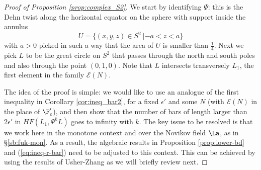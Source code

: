\begin{proof}[Proof of Proposition \ref{prop:complex_S2}]
We start by identifying $\Psi$: this is the Dehn twist along the 
horizontal equator on the sphere with support inside the annulus
$$U=\{(x,y,z)\in S^{2} \ |  -a  < z < a  \}$$ with $a>0$ picked in such
a way that the area of $U$ is smaller than $\frac{1}{4}$.
Next we pick $L$ to be the great circle on $S^{2}$ that passes through the north and south poles and also through the 
point $(0,1,0)$. Note that $L$ intersects transversely $L_{1}$, the first element in the family $\mathcal{E}(N)$.

The idea of the proof is simple: we would like to use an analogue of the first  inequality in Corollary \ref{cor:ineq_bar2}, for a fixed $\epsilon'$ and some $N$ (with $\mathcal{E}(N)$ in the place of $\F'_{\epsilon}$),  and then show that the number of bars of length larger than $2\epsilon'$ in 
$HF(L_{1},\Psi^{k}L)$ goes  to infinity with $k$. The key issue to be resolved is that we work here in the monotone context and over the Novikov field $\La$, as in \S\ref{sb:fuk-mon}. As a result, the algebraic
results in Proposition \ref{prop:lower-bd}  and (\ref{eq:ineq-r-bar}) need to be adjusted to this context. This can be achieved by using the results of Usher-Zhang \cite{Usher-Zhang:perh} as we will briefly
review next.


\end{proof}
